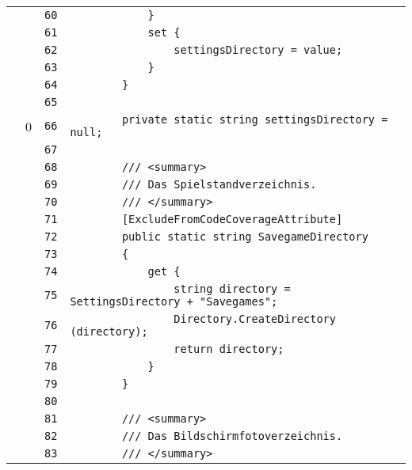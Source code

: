 \documentclass[a4paper,10pt]{article}
\begin{document}
\begin{longtable}[l]{lrrl}
\cellcolor{gray} &  & \verb~60~ & \verb~            }~\\
\cellcolor{gray} &  & \verb~61~ & \verb~            set {~\\
\cellcolor{gray} &  & \verb~62~ & \verb~                settingsDirectory = value;~\\
\cellcolor{gray} &  & \verb~63~ & \verb~            }~\\
\cellcolor{gray} &  & \verb~64~ & \verb~        }~\\
\cellcolor{gray} &  & \verb~65~ & \verb~~\\
\cellcolor{red} & 0 & \verb~66~ & \verb~        private static string settingsDirectory = null;~\\
\cellcolor{gray} &  & \verb~67~ & \verb~~\\
\cellcolor{gray} &  & \verb~68~ & \verb~        /// <summary>~\\
\cellcolor{gray} &  & \verb~69~ & \verb~        /// Das Spielstandverzeichnis.~\\
\cellcolor{gray} &  & \verb~70~ & \verb~        /// </summary>~\\
\cellcolor{gray} &  & \verb~71~ & \verb~        [ExcludeFromCodeCoverageAttribute]~\\
\cellcolor{gray} &  & \verb~72~ & \verb~        public static string SavegameDirectory~\\
\cellcolor{gray} &  & \verb~73~ & \verb~        {~\\
\cellcolor{gray} &  & \verb~74~ & \verb~            get {~\\
\cellcolor{gray} &  & \verb~75~ & \verb~                string directory = SettingsDirectory + "Savegames";~\\
\cellcolor{gray} &  & \verb~76~ & \verb~                Directory.CreateDirectory (directory);~\\
\cellcolor{gray} &  & \verb~77~ & \verb~                return directory;~\\
\cellcolor{gray} &  & \verb~78~ & \verb~            }~\\
\cellcolor{gray} &  & \verb~79~ & \verb~        }~\\
\cellcolor{gray} &  & \verb~80~ & \verb~~\\
\cellcolor{gray} &  & \verb~81~ & \verb~        /// <summary>~\\
\cellcolor{gray} &  & \verb~82~ & \verb~        /// Das Bildschirmfotoverzeichnis.~\\
\cellcolor{gray} &  & \verb~83~ & \verb~        /// </summary>~\\

\end{longtable}
\end{document}
